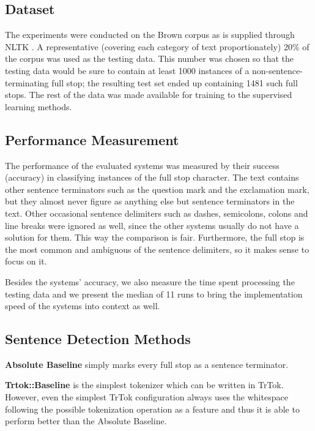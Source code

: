 \subsection{Dataset}

The experiments were conducted on the Brown corpus \cite{data-brown}
as is supplied through NLTK \cite{software-nltk}. A representative
(covering each category of text proportionately) 20\% of the corpus
was used as the testing data. This number was chosen so that the
testing data would be sure to contain at least 1000 instances of a
non-sentence-terminating full stop; the resulting test set ended up
containing 1481 such full stops. The rest of the data was made
available for training to the supervised learning methods.

\subsection{Performance Measurement}

The performance of the evaluated systems was measured by their success
(accuracy) in classifying instances of the full stop character. The
text contains other sentence terminators such as the question mark and
the exclamation mark, but they almost never figure as anything else
but sentence terminators in the text. Other occasional sentence
delimiters such as dashes, semicolons, colons and line breaks were
ignored as well, since the other systems usually do not have a
solution for them. This way the comparison is fair. Furthermore, the
full stop is the most common and ambiguous of the sentence delimiters,
so it makes sense to focus on it.

Besides the systems' accuracy, we also measure the time spent
processing the testing data and we present the median of 11 runs to
bring the implementation speed of the systems into context as well.

\subsection{Sentence Detection Methods}

\textbf{Absolute Baseline} simply marks every full stop as a sentence
terminator.

\textbf{Trtok::Baseline} is the simplest tokenizer which can be
written in TrTok. However, even the simplest TrTok configuration
always uses the whitespace following the possible tokenization
operation as a feature and thus it is able to perform better than the
Absolute Baseline.

